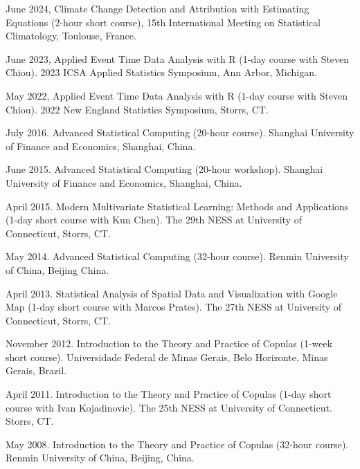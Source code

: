 \documentclass[Statistics]{vita}
\begin{document}
\begin{vita}
\begin{InvitedTalks}
  \end{InvitedTalks}
  \begin{InvitedWorkshops}
  \item June 2024, Climate Change Detection and Attribution with Estimating Equations (2-hour short course), 15th International Meeting on Statistical Climatology, Toulouse, France.
  \item June 2023, Applied Event Time Data Analysis with R (1-day course with Steven Chiou). 2023 ICSA Applied Statistics Symposium, Ann Arbor, Michigan.
  \item May 2022, Applied Event Time Data Analysis with R (1-day course with Steven Chiou). 2022 New England Statistics Symposium, Storrs, CT.
  \item July 2016. Advanced Statistical Computing (20-hour course). Shanghai University of Finance and Economics, Shanghai, China.
  \item June 2015. Advanced Statistical Computing (20-hour workshop). Shanghai University of Finance and Economics, Shanghai, China.
  \item April 2015. Modern Multivariate Statistical Learning: Methods and Applications (1-day short course with Kun Chen). The 29th NESS at University of Connecticut, Storrs, CT.
  \item May 2014. Advanced Statistical Computing (32-hour course). Renmin University of China, Beijing China.
  \item April 2013. Statistical Analysis of Spatial Data and Visualization with Google Map (1-day short course with Marcos Prates). The 27th NESS at University of Connecticut, Storrs, CT.
  \item November 2012. Introduction to the Theory and Practice of Copulas (1-week short course). Universidade Federal de Minas Gerais, Belo Horizonte, Minas Gerais, Brazil.
  \item April 2011. Introduction to the Theory and Practice of Copulas (1-day short course with Ivan Kojadinovic). The 25th NESS at University of Connecticut. Storrs, CT.
  \item May 2008. Introduction to the Theory and Practice of Copulas (32-hour course). Renmin University of China, Beijing, China.
  \end{InvitedWorkshops}

\end{vita}
\end{document}
